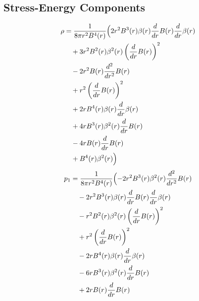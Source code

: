 \documentclass[11pt,a4paper]{article}
\begin{document}
\subsection{Stress-Energy Components}
\begin{tcolorbox}[colback=boxblue,colframe=black!40,title=\textbf{Physical stress-energy},breakable]
\begin{align*}
  \rho &= \frac{1}{8 \pi r^{2} B^{4}{\left(r \right)}}\Bigl(2 r^{2} B^{3}{\left(r \right)} \beta{\left(r \right)} \frac{d}{d r} B{\left(r \right)} \frac{d}{d r} \beta{\left(r \right)} \\
  &\quad + 3 r^{2} B^{2}{\left(r \right)} \beta^{2}{\left(r \right)} \left(\frac{d}{d r} B{\left(r \right)}\right)^{2} \\
  &\quad - 2 r^{2} B{\left(r \right)} \frac{d^{2}}{d r^{2}} B{\left(r \right)} \\
  &\quad + r^{2} \left(\frac{d}{d r} B{\left(r \right)}\right)^{2} \\
  &\quad + 2 r B^{4}{\left(r \right)} \beta{\left(r \right)} \frac{d}{d r} \beta{\left(r \right)} \\
  &\quad + 4 r B^{3}{\left(r \right)} \beta^{2}{\left(r \right)} \frac{d}{d r} B{\left(r \right)} \\
  &\quad - 4 r B{\left(r \right)} \frac{d}{d r} B{\left(r \right)} \\
  &\quad + B^{4}{\left(r \right)} \beta^{2}{\left(r \right)}\Bigr)
\end{align*}
\begin{align*}
  p_1 &= \frac{1}{8 \pi r^{2} B^{4}{\left(r \right)}}\Bigl(- 2 r^{2} B^{3}{\left(r \right)} \beta^{2}{\left(r \right)} \frac{d^{2}}{d r^{2}} B{\left(r \right)} \\
  &\quad - 2 r^{2} B^{3}{\left(r \right)} \beta{\left(r \right)} \frac{d}{d r} B{\left(r \right)} \frac{d}{d r} \beta{\left(r \right)} \\
  &\quad - r^{2} B^{2}{\left(r \right)} \beta^{2}{\left(r \right)} \left(\frac{d}{d r} B{\left(r \right)}\right)^{2} \\
  &\quad + r^{2} \left(\frac{d}{d r} B{\left(r \right)}\right)^{2} \\
  &\quad - 2 r B^{4}{\left(r \right)} \beta{\left(r \right)} \frac{d}{d r} \beta{\left(r \right)} \\
  &\quad - 6 r B^{3}{\left(r \right)} \beta^{2}{\left(r \right)} \frac{d}{d r} B{\left(r \right)} \\
  &\quad + 2 r B{\left(r \right)} \frac{d}{d r} B{\left(r \right)} \\

\end{align*}
\end{tcolorbox}
\end{document}
